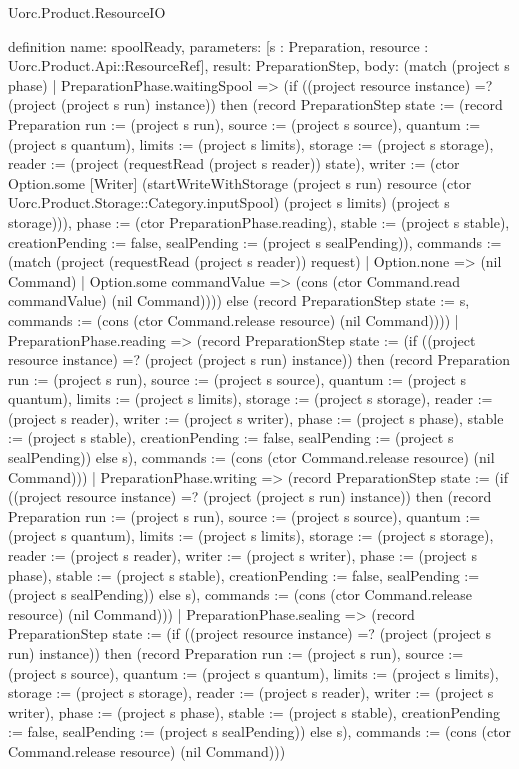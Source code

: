 \begin{lexlean}{Uorc.Product.ResourceIO}
\begin{semanticmodule}
definition{
  name: spoolReady,
  parameters: [s : Preparation, resource : Uorc.Product.Api::ResourceRef],
  result: PreparationStep,
  body: (match (project s phase)
    | PreparationPhase.waitingSpool => (if ((project resource instance) =? (project (project s run) instance)) then (record PreparationStep {state := (record Preparation {run := (project s run), source := (project s source), quantum := (project s quantum), limits := (project s limits), storage := (project s storage), reader := (project (requestRead (project s reader)) state), writer := (ctor Option.some [Writer] (startWriteWithStorage (project s run) resource (ctor Uorc.Product.Storage::Category.inputSpool) (project s limits) (project s storage))), phase := (ctor PreparationPhase.reading), stable := (project s stable), creationPending := false, sealPending := (project s sealPending)}), commands := (match (project (requestRead (project s reader)) request)
      | Option.none => (nil Command)
      | Option.some commandValue => (cons (ctor Command.read commandValue) (nil Command)))}) else (record PreparationStep {state := s, commands := (cons (ctor Command.release resource) (nil Command))}))
    | PreparationPhase.reading => (record PreparationStep {state := (if ((project resource instance) =? (project (project s run) instance)) then (record Preparation {run := (project s run), source := (project s source), quantum := (project s quantum), limits := (project s limits), storage := (project s storage), reader := (project s reader), writer := (project s writer), phase := (project s phase), stable := (project s stable), creationPending := false, sealPending := (project s sealPending)}) else s), commands := (cons (ctor Command.release resource) (nil Command))})
    | PreparationPhase.writing => (record PreparationStep {state := (if ((project resource instance) =? (project (project s run) instance)) then (record Preparation {run := (project s run), source := (project s source), quantum := (project s quantum), limits := (project s limits), storage := (project s storage), reader := (project s reader), writer := (project s writer), phase := (project s phase), stable := (project s stable), creationPending := false, sealPending := (project s sealPending)}) else s), commands := (cons (ctor Command.release resource) (nil Command))})
    | PreparationPhase.sealing => (record PreparationStep {state := (if ((project resource instance) =? (project (project s run) instance)) then (record Preparation {run := (project s run), source := (project s source), quantum := (project s quantum), limits := (project s limits), storage := (project s storage), reader := (project s reader), writer := (project s writer), phase := (project s phase), stable := (project s stable), creationPending := false, sealPending := (project s sealPending)}) else s), commands := (cons (ctor Command.release resource) (nil Command))})
}
\end{semanticmodule}
\end{lexlean}
